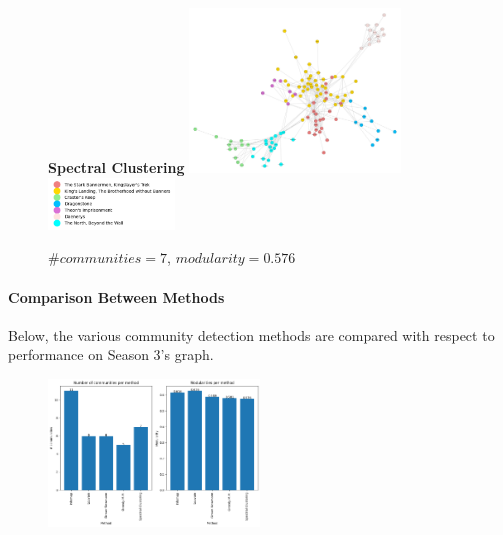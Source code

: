 \documentclass[10pt,twocolumn,letterpaper]{article}
\begin{document}
\begin{figure}[!h]
    \centering
    \textbf{Spectral Clustering}
    \includegraphics[width=0.5\textwidth]{img/s3/communities_sc.jpg}
    \includegraphics[width=0.3\textwidth]{img/s3/sc_legend.jpg}\\
    \caption{\small{$\#communities=7$, $modularity=0.576$}}
    \label{fig:sc_s3}
    \vspace{2cm}
\end{figure}



\paragraph{Comparison Between Methods}

Below, the various community detection methods are compared with respect to performance on Season 3's graph.

\begin{figure}[!h]
    \centering
    \includegraphics[width=0.5\textwidth]{img/s3/communities_comparison.jpg}
\end{figure}
\end{document}
